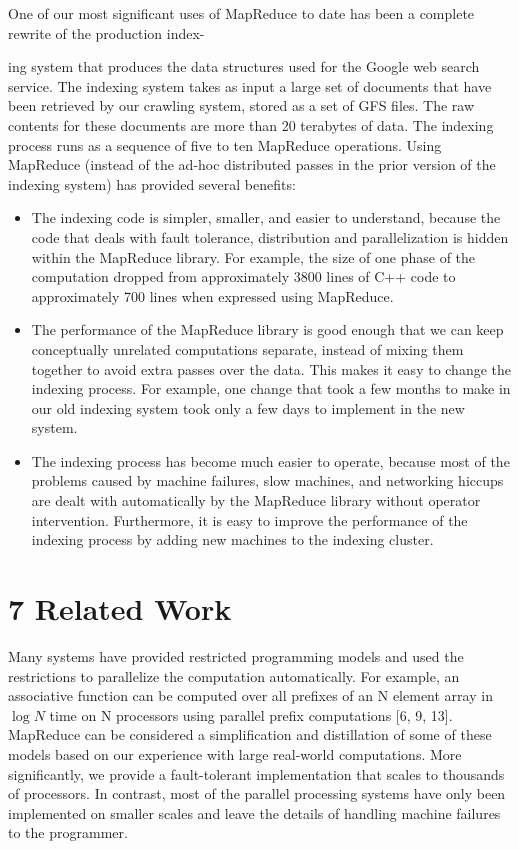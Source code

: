 \documentclass[
]{article}
\providecommand{\tightlist}{%
  \setlength{\itemsep}{0pt}\setlength{\parskip}{0pt}}
\begin{document}
One of our most significant uses of MapReduce to date has been a
complete rewrite of the production index-

ing system that produces the data structures used for the Google web
search service. The indexing system takes as input a large set of
documents that have been retrieved by our crawling system, stored as a
set of GFS files. The raw contents for these documents are more than 20
terabytes of data. The indexing process runs as a sequence of five to
ten MapReduce operations. Using MapReduce (instead of the ad-hoc
distributed passes in the prior version of the indexing system) has
provided several benefits:

\begin{itemize}
\tightlist
\item
  The indexing code is simpler, smaller, and easier to understand,
  because the code that deals with fault tolerance, distribution and
  parallelization is hidden within the MapReduce library. For example,
  the size of one phase of the computation dropped from approximately
  3800 lines of C++ code to approximately 700 lines when expressed using
  MapReduce.\\
\item
  The performance of the MapReduce library is good enough that we can
  keep conceptually unrelated computations separate, instead of mixing
  them together to avoid extra passes over the data. This makes it easy
  to change the indexing process. For example, one change that took a
  few months to make in our old indexing system took only a few days to
  implement in the new system.\\
\item
  The indexing process has become much easier to operate, because most
  of the problems caused by machine failures, slow machines, and
  networking hiccups are dealt with automatically by the MapReduce
  library without operator intervention. Furthermore, it is easy to
  improve the performance of the indexing process by adding new machines
  to the indexing cluster.
\end{itemize}

\section{7 Related Work}\label{related-work}

Many systems have provided restricted programming models and used the
restrictions to parallelize the computation automatically. For example,
an associative function can be computed over all prefixes of an N
element array in \(\log N\) time on N processors using parallel prefix
computations {[}6, 9, 13{]}. MapReduce can be considered a
simplification and distillation of some of these models based on our
experience with large real-world computations. More significantly, we
provide a fault-tolerant implementation that scales to thousands of
processors. In contrast, most of the parallel processing systems have
only been implemented on smaller scales and leave the details of
handling machine failures to the programmer.
\end{document}
